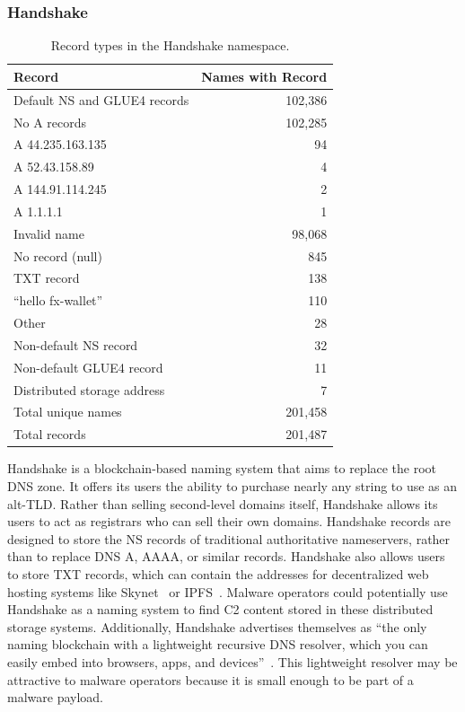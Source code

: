\subsubsection{Handshake}
\label{sec:handshake}
\begin{table}
	\begin{tabular}{lr}
		\toprule
		Record & Names with Record \\
		\midrule
		Default NS and GLUE4 records & 102,386 \\
		\hspace*{0.2in} No A records & 102,285\\
		\hspace*{0.2in} A 44.235.163.135 & 94 \\
		\hspace*{0.2in} A 52.43.158.89 & 4 \\
		\hspace*{0.2in} A 144.91.114.245 & 2 \\
		\hspace*{0.2in} A 1.1.1.1 & 1 \\
		Invalid name & 98,068 \\
		No record (null) & 845 \\
		TXT record & 138 \\
		\hspace*{0.2in} ``hello fx-wallet'' & 110 \\
		\hspace*{0.2in} Other & 28 \\
		Non-default NS record & 32 \\
		Non-default GLUE4 record & 11 \\
		Distributed storage address & 7 \\
		\midrule
		Total unique names & 201,458 \\
		Total records & 201,487 \\
		\bottomrule
	\end{tabular}
	\caption{Record types in the Handshake namespace.}
	\label{tab:handshake_records}
\end{table}

Handshake is a blockchain-based naming system that aims to replace the root DNS 
zone. It offers its users the ability to purchase nearly any 
string to 
use as an alt-TLD. Rather than selling second-level domains 
itself, Handshake allows its users 
to act as registrars who can sell their own domains. 
Handshake records are designed to store the NS records of traditional 
authoritative nameservers, rather than to replace DNS A, AAAA, or similar 
records. Handshake 
also allows users to 
store TXT records, which can contain the addresses for decentralized web 
hosting systems like Skynet~\cite{skynet} or IPFS~\cite{ipfs}. Malware 
operators could 
potentially use 
Handshake as a naming system to find C2 content stored in 
these distributed storage systems. Additionally, Handshake 
advertises themselves as ``the only naming blockchain with a lightweight 
recursive DNS resolver, which you can easily embed into 
browsers, apps, and devices''~\cite{namebase_access_handshake}. 
This lightweight resolver may be attractive to malware 
operators because it is 
small enough to be part of a malware payload.

